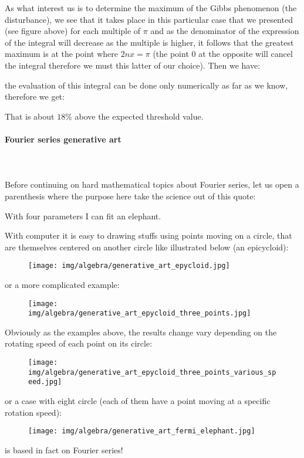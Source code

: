 	As what interest us is to determine the maximum of the Gibbs phenomenon (the disturbance), we see that it takes place in this particular case that we presented (see figure above) for each multiple of $\pi$ and as the denominator of the expression of the integral will decrease as the multiple is higher, it follows that the greatest maximum is at the point where $2nx=\pi$  (the point $0$ at the opposite will cancel the integral therefore we must this latter of our choice). Then we have:
	
	the evaluation of this integral can be done only numerically as far as we know, therefore we get:
	
	That is about $18\%$ above the expected threshold value.
	
	\paragraph{Fourier series generative art}\mbox{}\\\\
	Before continuing on hard mathematical topics about Fourier series, let us open a parenthesis where the purpose here take the science out of this quote:
	\begin{fquote}With four parameters I can fit an elephant.
 	\end{fquote}
 	With computer it is easy to drawing stuffs using points moving on a circle, that are themselves centered on another circle like illustrated below (an epicycloid):
 	\begin{figure}[H]
		\centering
		\texttt{[image: img/algebra/generative\_art\_epycloid.jpg]}
	\end{figure}
	or a more complicated example:
	\begin{figure}[H]
		\centering
		\texttt{[image: img/algebra/generative\_art\_epycloid\_three\_points.jpg]}
	\end{figure}
	Obviously as the examples above, the results change vary depending on the rotating speed of each point on its circle:
	\begin{figure}[H]
		\centering
		\texttt{[image: img/algebra/generative\_art\_epycloid\_three\_points\_various\_speed.jpg]}
	\end{figure}
	or a case with eight circle (each of them have a point moving at a specific rotation speed):
	\begin{figure}[H]
		\centering
		\texttt{[image: img/algebra/generative\_art\_fermi\_elephant.jpg]}
	\end{figure}
 	is based in fact on Fourier series!
 	
